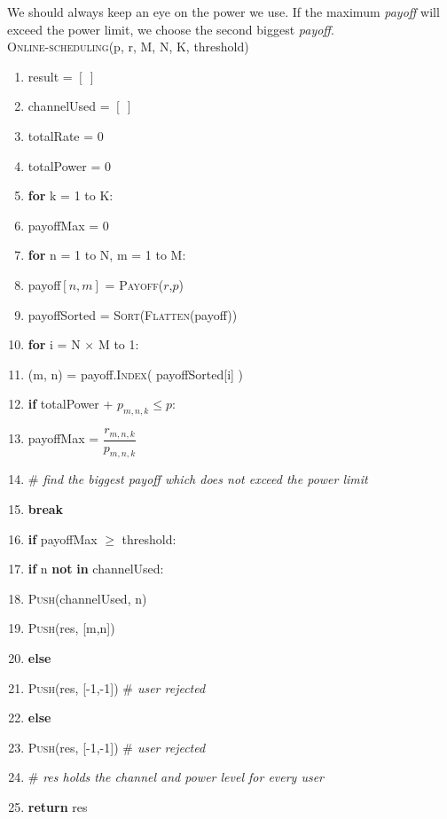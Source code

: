 \documentclass[11pt, oneside]{report}
\begin{document}
We should always keep an eye on the power we use. If the maximum \textit{payoff} will exceed the power limit, we choose the second biggest \textit{payoff}. \\

\noindent\textsc{Online-scheduling}(p, r, M, N, K, threshold)
\begin{enumerate}[1\ ]
\setlength{\topsep}{0.05ex}
\setlength{\itemsep}{0.05ex}
\item result = $[\ ]$
\item channelUsed  = $[\ ]$
\item totalRate = 0
\item totalPower = 0
\item \textbf{for} k = 1 to K:
\item \qquad payoffMax = 0
\item \qquad \textbf{for} n = 1 to N, m = 1 to M:
\item \qquad \qquad payoff$[n, m]$ = \textsc{Payoff}($r$,$p$)
\item \qquad payoffSorted = \textsc{Sort}(\textsc{Flatten}(payoff))
\item \qquad \textbf{for} i = N $\times$ M to 1:
\item \qquad \qquad (m, n) = payoff.\textsc{Index}( payoffSorted[i] )
\item \qquad \qquad \textbf{if} totalPower + $p_{m,n,k} \leq p$:
\item \qquad \qquad \qquad payoffMax = $\dfrac{r_{m,n,k}}{p_{m,n,k}}$
\item \qquad \qquad \qquad $\#$ \textit{find the biggest payoff which does not exceed the power limit}
\item \qquad \qquad \qquad \textbf{break}
\item \qquad \textbf{if} payoffMax $\geq$ threshold:
\item \qquad \qquad \textbf{if} n \textbf{not} \textbf{in} channelUsed:
\item \qquad \qquad \qquad \textsc{Push}(channelUsed, n)
\item \qquad \qquad \qquad \textsc{Push}(res, [m,n])
\item \qquad \qquad \textbf{else}
\item \qquad \qquad \qquad \textsc{Push}(res, [-1,-1])   \textit{$\#$ user rejected}
\item \qquad \textbf{else}
\item \qquad \qquad \textsc{Push}(res, [-1,-1])   \textit{$\#$ user rejected}
\item $\#$ \textit{res holds the channel and power level for every user}
\item \textbf{return} res
\end{enumerate}
\end{document}
